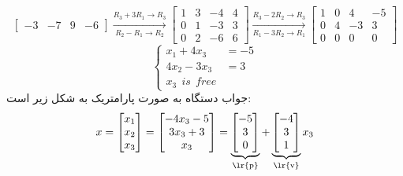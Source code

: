 \documentclass{article}
\begin{document}
\begin{حل}
\begin{itemize}
$$\begin{bmatrix}
		-3&-7&9&-6
		\end{bmatrix}\xrightarrow[R_2-R_1\to R_2]{R_3+3R_1\to R_3}
		\begin{bmatrix}
		1&3&-4&4\\
		0&1&-3&3\\
		0&2&-6&6
		\end{bmatrix}\xrightarrow[R_1-3R_2\to R_1]{R_3-2R_2\to R_3}
		\begin{bmatrix}
		1&0&4&-5\\
		0&4&-3&3\\
		0&0&0&0
		\end{bmatrix}$$
		$$\left\{
		\begin{array}{rl}
		x_1+4x_3&=-5\\
		4x_2-3x_3&=3\\
		x_3 \ \ is\ \ free
		\end{array} \right.$$
		جواب دستگاه به صورت پارامتریک به شکل زیر است:
		$$x=\begin{bmatrix}
		x_1\\
		x_2\\
		x_3
			\end{bmatrix}=
	\begin{bmatrix}
			-4x_3-5\\
			3x_3+3\\
			x_3
			\end{bmatrix}	=
				\underbrace{\begin{bmatrix}
			-5\\
			3\\
			0\\
			\end{bmatrix}}_\text{\lr{p}}+
			\underbrace{\begin{bmatrix}
			-4\\
			3\\
			1
			\end{bmatrix}}_\text{\lr{v}}x_3$$
	\end{itemize}
\end{حل}
\end{document}
